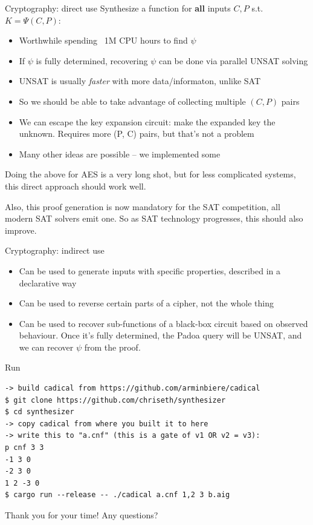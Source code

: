 \documentclass[aspectratio=169]{beamer}
\begin{document}
\begin{frame}{Cryptography: direct use}
Synthesize a function for \textbf{all} inputs $C, P$ s.t. $K=\Psi(C, P)$:
\begin{itemize}
    \item Worthwhile spending ~1M CPU hours to find $\psi$
    \item If $\psi$ is fully determined, recovering $\psi$
        can be done via parallel UNSAT solving
    \item UNSAT is usually \emph{faster} with more data/informaton, unlike SAT
    \item So we should be able to take advantage of collecting multiple $(C,
        P)$ pairs
    \item We can escape the key expansion circuit: make the expanded key the
        unknown. Requires more (P, C) pairs, but that's not a problem
    \item Many other ideas are possible -- we implemented some
\end{itemize}
\smallskip

Doing the above for AES is a very long shot, but for less complicated systems,
this direct approach should work well.
\smallskip

Also, this proof generation is now mandatory for the SAT competition,
all modern SAT solvers emit one. So as SAT technology progresses,
this should also improve.
\end{frame}

\begin{frame}{Cryptography: indirect use}
\begin{itemize}
    \item Can be used to generate inputs with specific properties,
        described in a declarative way
    \item Can be used to reverse certain parts of a cipher, not the
        whole thing
    \item Can be used to recover sub-functions of a black-box circuit
        based on observed behaviour. Once it's fully determined,
        the Padoa query will be UNSAT, and we can recover $\psi$
        from the proof.
\end{itemize}
\end{frame}

\begin{frame}[fragile]{Run}
\begin{verbatim}
-> build cadical from https://github.com/arminbiere/cadical
$ git clone https://github.com/chriseth/synthesizer
$ cd synthesizer
-> copy cadical from where you built it to here
-> write this to "a.cnf" (this is a gate of v1 OR v2 = v3):
p cnf 3 3
-1 3 0
-2 3 0
1 2 -3 0
$ cargo run --release -- ./cadical a.cnf 1,2 3 b.aig
\end{verbatim}
\end{frame}

\begin{frame}{Thank you for your time!}
    Any questions?
\end{frame}
\end{document}

